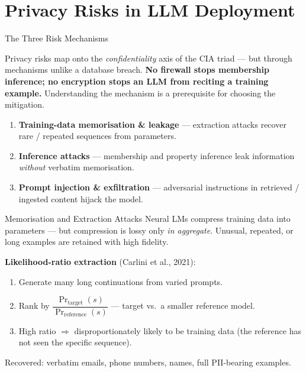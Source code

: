 \documentclass[9pt,t]{beamer}
\begin{document}
\section{Privacy Risks in LLM Deployment}

\begin{frame}{The Three Risk Mechanisms}
\begin{bigpicture}
Privacy risks map onto the \emph{confidentiality} axis of the CIA triad --- but
through mechanisms unlike a database breach. \textbf{No firewall stops membership
inference; no encryption stops an LLM from reciting a training example.}
Understanding the mechanism is a prerequisite for choosing the mitigation.
\end{bigpicture}

\medskip
\begin{enumerate}
  \item \textbf{Training-data memorisation \& leakage} --- extraction attacks recover
        rare / repeated sequences from parameters.
  \item \textbf{Inference attacks} --- membership and property inference leak
        information \emph{without} verbatim memorisation.
  \item \textbf{Prompt injection \& exfiltration} --- adversarial instructions in
        retrieved / ingested content hijack the model.
\end{enumerate}
\end{frame}

\begin{frame}{Memorisation and Extraction Attacks}
Neural LMs compress training data into parameters --- but compression is lossy only
\emph{in aggregate}. Unusual, repeated, or long examples are retained with high fidelity.

\medskip
\begin{underhood}
\textbf{Likelihood-ratio extraction} (Carlini et al., 2021):
\begin{enumerate}
  \item Generate many long continuations from varied prompts.
  \item Rank by $\dfrac{\Pr_{\text{target}}(s)}{\Pr_{\text{reference}}(s)}$ --- target
        vs.\ a smaller reference model.
  \item High ratio $\Rightarrow$ disproportionately likely to be training data
        (the reference has not seen the specific sequence).
\end{enumerate}
Recovered: verbatim emails, phone numbers, names, full PII-bearing examples.
\end{underhood}
\end{frame}
\end{document}
